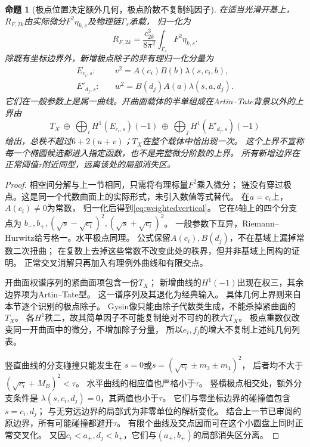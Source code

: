 \documentclass[11pt,a4paper]{ctexart}
\theoremstyle{cnplain}\newtheorem{theorem}{定理}[section]
\newtheorem{proposition}[theorem]{命题}
\theoremstyle{definition}\newtheorem{definition}[theorem]{定义}
\theoremstyle{remark}\newtheorem{remark}[theorem]{注}
\begin{document}
\begin{proposition}[极点位置决定额外几何，极点阶数不复制纯因子]\label{prop:weightedupper}
在适当光滑开基上，$R_{F,2k}$由实际微分$F^2\eta_{k,s}$及物理链$\Gamma_s$承载，
归一化为
\[
 R_{F,2k}=\frac{c_{2k}^3}{8\pi^2}\int_{\Gamma_s}F^2\eta_{k,s}.
\]
除既有坐标边界外，新增极点除子的非有理归一化分量为
\begin{align}
 E_{c_i,s}:&\quad v^2=A(c_i)B(b)\lambda(s,c_i,b),\label{eq:weightedvertical}\\
 E'_{d_j,s}:&\quad w^2=B(d_j)A(a)\lambda(s,a,d_j).\label{eq:weightedhorizontal}
\end{align}
它们在一般参数上是属一曲线。开曲面载体的半单组成在Artin--Tate背景以外的上界由
\begin{equation}\label{eq:weightedupper}
 T_X\ \oplus\ \bigoplus_i H^1(E_{c_i,s})(-1)\
       \oplus\ \bigoplus_j H^1(E'_{d_j,s})(-1)
\end{equation}
给出，总秩不超过$6+2(u+v)$；$T_X$在整个载体中恰出现一次。
这个上界不宣称每一个椭圆候选都进入指定函数，也不是完整微分阶数的上界。
所有新增边界在正常阈值$\tau$附近同型，远离该处的局部消失区。
\end{proposition}
\begin{proof}
相空间分解与上一节相同，只需将有理标量$F^2$乘入微分；
链没有穿过极点。这是同一个代数曲面上的实际形式，未引入数值等式替代。
在$a=c_i$上，$A(c_i)\ne0$为常数，
归一化后得到\eqref{eq:weightedvertical}。
它在$b$轴上的四个分支点为
$b_-,b_+,(\sqrt{s}-\sqrt{c_i})^2,(\sqrt{s}+\sqrt{c_i})^2$。
一般参数下互异，Riemann--Hurwitz给亏格一。水平极点同理。
公式保留$A(c_i),B(d_j)$，不在基域上漏掉常数二次扭曲；
在复数上去掉这些常数不改变此处的秩界，但并非基域上同构的证明。
正常交叉消解只再加入有理例外曲线和有限交点。

开曲面权谱序列的紧曲面项包含一份$T_X$；
新增曲线的$H^1(-1)$出现在权三，其余边界项为Artin--Tate型。
这一谱序列及其退化为经典输入\cite{DeligneWeight}。
具体几何上界则来自本节逐个识别的极点除子。
Gysin像只能由除子代数类生成，不能杀掉紧曲面的$T_X$。
各$H^1$秩二，故其简单因子不可能复制绝对不可约的秩六$T_X$。
极点重数仅改变同一开曲面中的微分，不增加除子分量，
所以$e_i,f_j$的增大不复制上述纯几何列表。

竖直曲线的分支碰撞只能发生在
$s=0$或$s=(\sqrt{c_i}\pm m_3\pm m_4)^2$，
后者均不大于$(\sqrt{c_i}+M_B)^2<\tau$。
水平曲线的相应值也严格小于$\tau$。
竖横极点相交处，额外分支条件是
$\lambda(s,c_i,d_j)=0$，其两值也小于$\tau$。
它们与零坐标边界的碰撞值包含$s=c_i,d_j$；
与无穷远边界的局部式为非零单位的解析变化。
结合上一节已审阅的原边界，所有可能碰撞都避开$\tau$。
有限个曲线及交点因而可在这个小圆盘上同时正常交叉化。
又因$c_i<a_+,d_j<b_+$，它们与$(a_+,b_+)$的局部消失区分离。
\end{proof}
\end{document}
